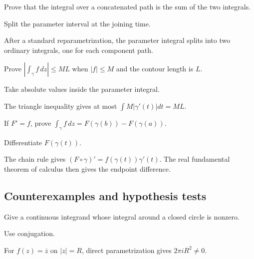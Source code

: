 \begin{exercise}[Concatenation]\label{exr:iv04-expand-07}
Prove that the integral over a concatenated path is the sum of the two integrals.
\end{exercise}
\begin{hint}
Split the parameter interval at the joining time.
\end{hint}
\begin{solution}
After a standard reparametrization, the parameter integral splits into two ordinary integrals, one for each component path.
\end{solution}

\begin{exercise}[ML inequality]\label{exr:iv04-expand-08}
Prove \(|\int_\gamma f\,dz|\le ML\) when \(|f|\le M\) and the contour length is \(L\).
\end{exercise}
\begin{hint}
Take absolute values inside the parameter integral.
\end{hint}
\begin{solution}
The triangle inequality gives at most \(\int M|\gamma'(t)|dt=M L\).
\end{solution}

\begin{exercise}\label{exr:iv04-expand-09}
If \(F'=f\), prove \(\int_\gamma f\,dz=F(\gamma(b))-F(\gamma(a))\).
\end{exercise}
\begin{hint}
Differentiate \(F(\gamma(t))\).
\end{hint}
\begin{solution}
The chain rule gives \((F\circ\gamma)'=f(\gamma(t))\gamma'(t)\). The real fundamental theorem of calculus then gives the endpoint difference.
\end{solution}

\subsection*{Counterexamples and hypothesis tests}

\begin{exercise}\label{exr:iv04-expand-10}
Give a continuous integrand whose integral around a closed circle is nonzero.
\end{exercise}
\begin{hint}
Use conjugation.
\end{hint}
\begin{solution}
For \(f(z)=\overline z\) on \(|z|=R\), direct parametrization gives \(2\pi iR^2\ne0\).
\end{solution}

